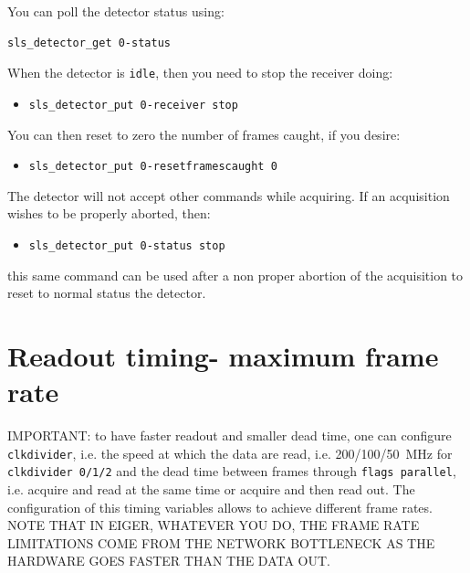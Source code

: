 \documentclass{article}
\begin{document}
You can poll the detector status using:
\begin{verbatim}
sls_detector_get 0-status 
\end{verbatim}
When the detector is {\tt{idle}}, then you need to stop the receiver doing:
\begin{itemize}
\item {\tt{sls\_detector\_put 0-receiver stop}} 
\end{itemize}
You can then reset to zero the number of frames caught, if you desire:
\begin{itemize}
\item {\tt{sls\_detector\_put 0-resetframescaught 0}} 
\end{itemize}

The detector will not accept other commands while acquiring. If an acquisition wishes to be properly aborted, then:
\begin{itemize}
\item {\tt{sls\_detector\_put 0-status stop}} 
\end{itemize}
this same command can be used after a non proper abortion of the acquisition to reset to normal status the detector.

\section{Readout timing- maximum frame rate}\label{timing}
IMPORTANT: to have faster readout and smaller dead time, one can configure {\tt{clkdivider}}, i.e. the speed at which the data are read, i.e. 200/100/50~MHz for {\tt{clkdivider 0/1/2}} and the dead time between frames through {\tt{flags parallel}}, i.e. acquire and read at the same time or acquire and then read out.
The configuration of this timing variables allows to achieve different frame rates. NOTE THAT IN EIGER, WHATEVER YOU DO, THE FRAME RATE LIMITATIONS COME FROM THE NETWORK BOTTLENECK AS THE HARDWARE GOES FASTER THAN THE DATA OUT.
\end{document}
